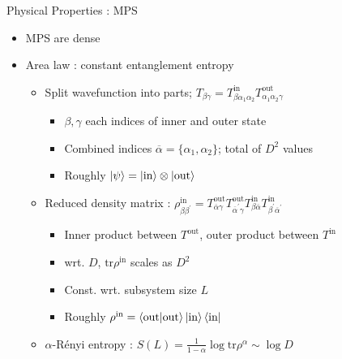 \documentclass{beamer}
\begin{document}
\begin{frame}{Physical Properties : MPS}
	\begin{itemize}
		\item MPS are dense
	\item Area law : constant entanglement entropy
		\begin{itemize}
		\item Split wavefunction into parts; ${ T_{\beta \gamma }=T^{\text{in}}_{\beta \alpha_1 \alpha_2} T^{\text{out}}_{\alpha _{1}\alpha _{2}\gamma }}$
			\begin{itemize}
			\item ${ \beta ,\gamma  }$ each indices of inner and outer state
			\item Combined indices ${ \overline{\alpha }=\{\alpha _{1},\alpha _{2}\} }$; total of ${ D^2  }$ values
			\item Roughly ${\ket{\psi }=\ket{\text{in}}\otimes \ket{\text{out}} }$
			\end{itemize}
		\item Reduced density matrix : ${ \rho_{\beta \beta ^{\prime}} ^{\text{in}}=T^{\text{out}}_{\overline{\alpha }\gamma }T^{\text{out}}_{\overline{\alpha }^{\prime}\gamma }T^{\text{in}}_{\beta \overline{\alpha }}T^{\text{in}}_{\beta^{\prime}\overline{\alpha }^{\prime}} }$
			\begin{itemize}
			\item Inner product between ${ T^{\text{out}} }$, outer product between ${ T^{\text{in}} }$
		\item wrt. ${ D }$, ${ \text{tr}\rho ^{\text{in}} }$ scales as ${ D^2  }$
		\item Const. wrt. subsystem size ${ L }$
		\item Roughly ${ \rho ^{\text{in}}=\ev{\text{out}|\text{out}}\ket{\text{in}}\bra{\text{in}} }$
			\end{itemize}
		\item ${ \alpha  }$-R\'enyi entropy : ${ S(L)= \frac{1}{1-\alpha }\log{\text{tr}\rho ^{\alpha }}\sim \log{D}}$
		\end{itemize}
	\end{itemize}
\end{frame}
\end{document}
